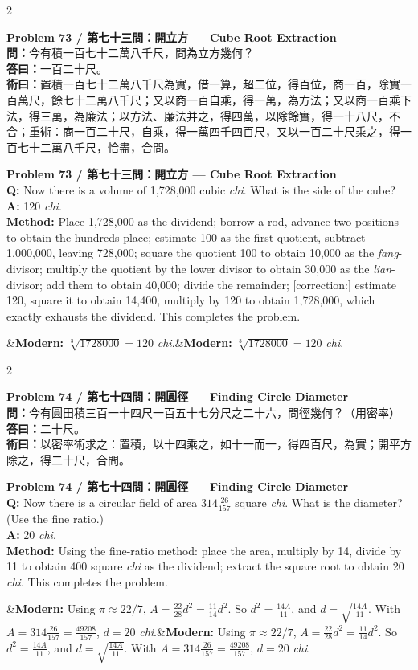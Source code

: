 \documentclass[11pt,a4paper]{article}
\newcommand{\bilingualproblem}[4]{%
  \begin{paracol}{2}
  \begin{leftcolumn}
  \noindent\textbf{\color{problemcolor}#1}\\[0.2cm]
  #2
  \end{leftcolumn}
  \switchcolumn
  \noindent\textbf{\color{problemcolor}#1}\\[0.2cm]
  #3
  \end{paracol}
  \ifx&#4&\else\vspace{0.3cm}\noindent#4\fi
  \vspace{0.5cm}
}
\newcommand{\wen}[1]{\textcolor{problemcolor}{\textbf{問：}}#1}
\newcommand{\da}[1]{\textcolor{answercolor}{\textbf{答曰：}}#1}
\newcommand{\shu}[1]{\textcolor{methodcolor}{\textbf{術曰：}}#1}
\newcommand{\wenen}[1]{\textcolor{problemcolor}{\textbf{Q:}} #1}
\newcommand{\daen}[1]{\textcolor{answercolor}{\textbf{A:}} #1}
\newcommand{\shuen}[1]{\textcolor{methodcolor}{\textbf{Method:}} #1}
\begin{document}
\bilingualproblem{Problem 73 / 第七十三問：開立方 --- Cube Root Extraction}{
\wen{今有積一百七十二萬八千尺，問為立方幾何？}\\[0.2cm]
\da{一百二十尺。}\\[0.2cm]
\shu{置積一百七十二萬八千尺為實，借一算，超二位，得百位，商一百，除實一百萬尺，餘七十二萬八千尺；又以商一百自乘，得一萬，為方法；又以商一百乘下法，得三萬，為廉法；以方法、廉法并之，得四萬，以除餘實，得一十八尺，不合；重術：商一百二十尺，自乘，得一萬四千四百尺，又以一百二十尺乘之，得一百七十二萬八千尺，恰盡，合問。}
}{
\wenen{Now there is a volume of 1,728,000 cubic \textit{chi}. What is the side of the cube?}\\[0.2cm]
\daen{120 \textit{chi}.}\\[0.2cm]
\shuen{Place 1,728,000 as the dividend; borrow a rod, advance two positions to obtain the hundreds place; estimate 100 as the first quotient, subtract 1,000,000, leaving 728,000; square the quotient 100 to obtain 10,000 as the \textit{fang}-divisor; multiply the quotient by the lower divisor to obtain 30,000 as the \textit{lian}-divisor; add them to obtain 40,000; divide the remainder; [correction:] estimate 120, square it to obtain 14,400, multiply by 120 to obtain 1,728,000, which exactly exhausts the dividend. This completes the problem.}
}{\textbf{Modern:} $\sqrt[3]{1728000} = 120$ \textit{chi}.}

\newpage

\bilingualproblem{Problem 74 / 第七十四問：開圓徑 --- Finding Circle Diameter}{
\wen{今有圓田積三百一十四尺一百五十七分尺之二十六，問徑幾何？（用密率）}\\[0.2cm]
\da{二十尺。}\\[0.2cm]
\shu{以密率術求之：置積，以十四乘之，如十一而一，得四百尺，為實；開平方除之，得二十尺，合問。}
}{
\wenen{Now there is a circular field of area $314\frac{26}{157}$ square \textit{chi}. What is the diameter? (Use the fine ratio.)}\\[0.2cm]
\daen{20 \textit{chi}.}\\[0.2cm]
\shuen{Using the fine-ratio method: place the area, multiply by 14, divide by 11 to obtain 400 square \textit{chi} as the dividend; extract the square root to obtain 20 \textit{chi}. This completes the problem.}
}{\textbf{Modern:} Using $\pi \approx 22/7$, $A = \frac{22}{28} d^2 = \frac{11}{14} d^2$. So $d^2 = \frac{14A}{11}$, and $d = \sqrt{\frac{14A}{11}}$. With $A = 314\frac{26}{157} = \frac{49208}{157}$, $d = 20$ \textit{chi}.}
\end{document}
